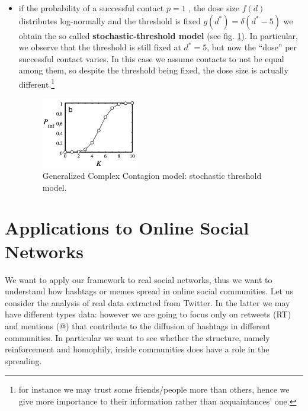 \documentclass[../main/main.tex]{subfiles}
\begin{document}
\begin{itemize}
\item if the probability of a successful contact \( p=1 \) , the dose size $f(d)$ distributes log-normally and the threshold is fixed $g(d^*) = \delta(d^*-5)$ we obtain the so called \textbf{stochastic-threshold model} (see fig. \ref{fig:11_3}). In particular, we observe that the threshold is still fixed at \( d^*=5 \), but now the “dose” per successful contact varies.
In this case we assume contacts to not be equal among them, so despite the threshold being fixed, the dose size is actually different.\footnote{for instance we may trust some friends/people more than others, hence we give more importance to their information rather than acquaintances' one.} 

\begin{figure}[h!]
\centering
\includegraphics[width=0.4\textwidth]{../lessons/image/11/3.png}
\caption{\label{fig:11_3} Generalized Complex Contagion model: stochastic threshold model.}
\end{figure}

\end{itemize}






\section{Applications to Online Social Networks}

We want to apply our framework to real social networks, thus we want to understand how hashtags or memes spread in online social communities. Let us consider the analysis of real data extracted from Twitter. In the latter we may have different types data: however we are going to focus only on retweets (RT) and mentions (@) that contribute to the diffusion of hashtags in different communities. In particular we want to see whether the structure, namely reinforcement and homophily, inside communities does have a role in the spreading.
\end{document}
